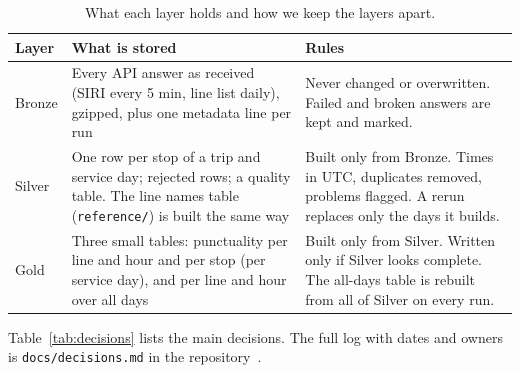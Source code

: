 \documentclass[11pt,a4paper]{article}
\newcommand{\rowline}{\arrayrulecolor{black!25}\midrule\arrayrulecolor{black}}
\newcommand{\code}[1]{\texttt{#1}}
\begin{document}
\begin{table}[htb]
\centering\small
\renewcommand{\arraystretch}{1.25}
\begin{tabularx}{\linewidth}{@{}l>{\raggedright}X>{\raggedright\arraybackslash}p{6.2cm}@{}}
\toprule
Layer & What is stored & Rules \\
\midrule
Bronze & Every API answer as received (SIRI every 5 min, line list daily), gzipped, plus one metadata line per run &
  Never changed or overwritten. Failed and broken answers are kept and marked. \\ \rowline
Silver & One row per stop of a trip and service day; rejected rows; a quality table. The line names table (\code{reference/}) is built the same way &
  Built only from Bronze. Times in UTC, duplicates removed, problems flagged. A rerun replaces only the days it builds. \\ \rowline
Gold & Three small tables: punctuality per line and hour and per stop (per service day), and per line and hour over all days &
  Built only from Silver. Written only if Silver looks complete. The all-days table is rebuilt from all of Silver on every run. \\
\bottomrule
\end{tabularx}
\caption{What each layer holds and how we keep the layers apart.}
\label{tab:layers}
\end{table}

Table~\ref{tab:decisions} lists the main decisions. The full log with dates and owners is
\code{docs/decisions.md} in the repository~\cite{repo}.
\end{document}
